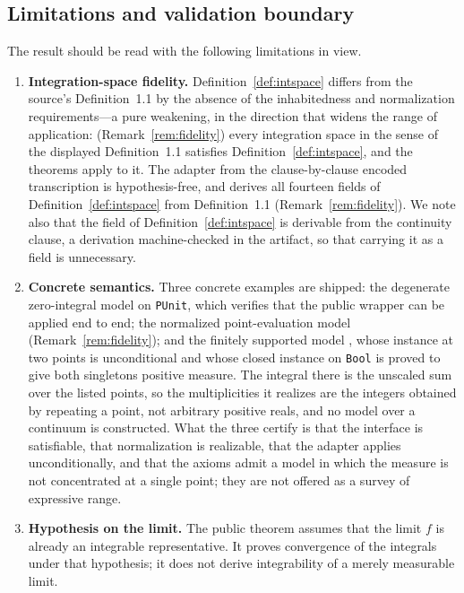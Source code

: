\documentclass[11pt]{article}
\theoremstyle{definition}
\theoremstyle{remark}
\begin{document}
\subsection{Limitations and validation boundary}
\label{sec:limitations}

The result should be read with the following limitations in view.
\begin{enumerate}[label=(\arabic*)]
\item \textbf{Integration-space fidelity.}  Definition~\ref{def:intspace} differs from the source's Definition~1.1 by the absence of the inhabitedness and normalization requirements---a pure weakening, in the direction that widens the range of application: (Remark~\ref{rem:fidelity}) every integration space in the sense of the displayed Definition~1.1 satisfies Definition~\ref{def:intspace}, and the theorems apply to it.  The adapter from the clause-by-clause encoded transcription is hypothesis-free, and  derives all fourteen fields of Definition~\ref{def:intspace} from Definition~1.1 (Remark~\ref{rem:fidelity}).  We note also that the field  of Definition~\ref{def:intspace} is derivable from the continuity clause, a derivation machine-checked in the artifact, so that carrying it as a field is unnecessary.

\item \textbf{Concrete semantics.}  Three concrete examples are shipped: the degenerate zero-integral model on \texttt{PUnit}, which verifies that the public wrapper can be applied end to end; the normalized point-evaluation model  (Remark~\ref{rem:fidelity}); and the finitely supported model , whose instance at two points is unconditional and whose closed instance on \texttt{Bool} is proved to give both singletons positive measure.  The integral there is the unscaled sum over the listed points, so the multiplicities it realizes are the integers obtained by repeating a point, not arbitrary positive reals, and no model over a continuum is constructed.  What the three certify is that the interface is satisfiable, that normalization is realizable, that the adapter applies unconditionally, and that the axioms admit a model in which the measure is not concentrated at a single point; they are not offered as a survey of expressive range.

\item \textbf{Hypothesis on the limit.}  The public theorem assumes that the limit $f$ is already an integrable representative.  It proves convergence of the integrals under that hypothesis; it does not derive integrability of a merely measurable limit.


\end{enumerate}
\end{document}
